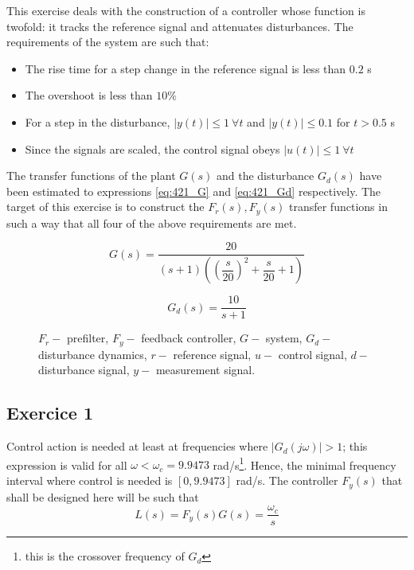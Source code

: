 This exercise deals with the construction of a controller whose function is
twofold: it tracks the reference signal and attenuates disturbances. The
requirements of the system are such that:

\begin{itemize}
  \item The rise time for a step change in the reference signal is less than
  $0.2$ s
  \item The overshoot is less than $10\%$
  \item For a step in the disturbance, $|y(t)| \leq 1\ \forall t$ and
  $|y(t)| \leq 0.1$ for $t > 0.5$ s
  \item Since the signals are scaled, the control signal obeys $|u(t)| \leq 1\
  \forall t$
\end{itemize}

The transfer functions of the plant $G(s)$ and the disturbance $G_d(s)$ have
been estimated to expressions \ref{eq:421_G} and \ref{eq:421_Gd} respectively.
The target of this exercise is to construct the $F_r(s), F_y(s)$ transfer
functions in such a way that all four of the above requirements are met.

\begin{equation}
  G(s) = \dfrac{20}{(s+1)((\dfrac{s}{20})^2 + \dfrac{s}{20} + 1)}
  \label{eq:421_G}
\end{equation}

\begin{equation}
  G_d(s) = \dfrac{10}{s+1}
  \label{eq:421_Gd}
\end{equation}

\begin{figure}[H]\centering
  \scalebox{0.8}{}
  \caption{$F_r-$ prefilter, $F_y-$ feedback controller, $G-$ system, $G_d-$
    disturbance dynamics, $r-$ reference signal, $u-$ control signal,
    $d-$ disturbance signal, $y-$ measurement signal.}
  \label{fig:block_2}
\end{figure}

\subsection{Exercice 1}

Control action is needed at least at frequencies where $|G_d(j\omega)| > 1$;
this expression is valid for all $\omega < \omega_c = 9.9473$ rad/s\footnote{
this is the crossover frequency of $G_d$}. Hence, the minimal frequency interval
where control is needed is $[0, 9.9473]$ rad/s. The controller $F_y(s)$ that
shall be designed here will be such that
$$L(s) = F_y(s)G(s) = \dfrac{\omega_c}{s}$$

